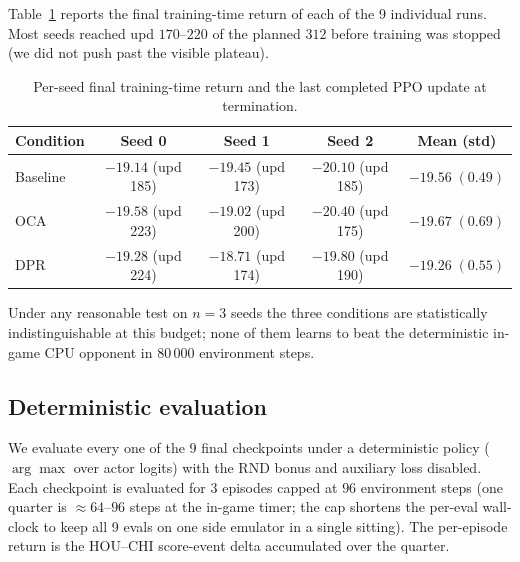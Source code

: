 \documentclass{article}
\begin{document}
Table~\ref{tab:perseed} reports the final training-time return of
each of the 9 individual runs. Most seeds reached upd $170$--$220$
of the planned $312$ before training was stopped (we did not push
past the visible plateau).

\begin{table}[h]
  \caption{Per-seed final training-time return and the last
  completed PPO update at termination.}
  \label{tab:perseed}
  \centering
  \small
  \begin{tabular}{lcccc}
    \toprule
    \textbf{Condition} & \textbf{Seed 0} & \textbf{Seed 1} & \textbf{Seed 2} & \textbf{Mean (std)} \\
    \midrule
    Baseline & $-19.14$ (upd 185) & $-19.45$ (upd 173) & $-20.10$ (upd 185) & $-19.56\;(0.49)$ \\
    OCA      & $-19.58$ (upd 223) & $-19.02$ (upd 200) & $-20.40$ (upd 175) & $-19.67\;(0.69)$ \\
    DPR      & $-19.28$ (upd 224) & $-18.71$ (upd 174) & $-19.80$ (upd 190) & $\mathbf{-19.26\;(0.55)}$ \\
    \bottomrule
  \end{tabular}
\end{table}

Under any reasonable test on $n{=}3$ seeds the three conditions
are statistically indistinguishable at this budget; none of them
learns to beat the deterministic in-game CPU opponent in $80\,000$
environment steps.

\subsection{Deterministic evaluation}
\label{sec:eval}

We evaluate every one of the 9 final checkpoints under a deterministic
policy ($\arg\max$ over actor logits) with the RND bonus and
auxiliary loss disabled. Each checkpoint is evaluated for $3$
episodes capped at $96$ environment steps (one quarter is
$\approx 64$--$96$ steps at the in-game timer; the cap shortens
the per-eval wall-clock to keep all 9 evals on one side emulator
in a single sitting). The per-episode return is the HOU--CHI
score-event delta accumulated over the quarter.
\end{document}
